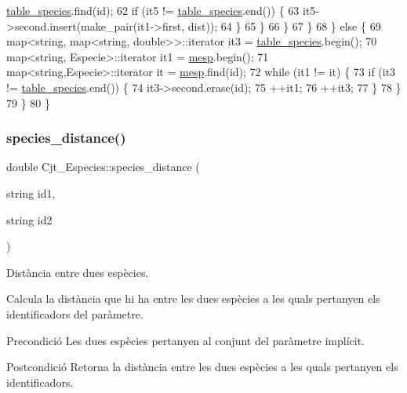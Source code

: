 \begin{DoxyCode}
      \hyperlink{class_cjt___especies_ae56d242080836b8d3db505f0a8623090}{table\_species}.find(\textcolor{keywordtype}{id});
62                     \textcolor{keywordflow}{if} (it5 != \hyperlink{class_cjt___especies_ae56d242080836b8d3db505f0a8623090}{table\_species}.end()) \{                            
63                         it5->second.insert(make\_pair(it1->first, dist));
64                     \}
65                 \}
66             \}
67         \} 
68     \} \textcolor{keywordflow}{else} \{
69         map<string, map<string, double>>::iterator it3 = \hyperlink{class_cjt___especies_ae56d242080836b8d3db505f0a8623090}{table\_species}.begin();
70         map<string, Especie>::iterator it1 = \hyperlink{class_cjt___especies_a64a525b38c78935e7432b362ea9a2306}{mesp}.begin();
71         map<string,Especie>::iterator it = \hyperlink{class_cjt___especies_a64a525b38c78935e7432b362ea9a2306}{mesp}.find(\textcolor{keywordtype}{id});
72         \textcolor{keywordflow}{while} (it1 != it) \{
73             \textcolor{keywordflow}{if} (it3 != \hyperlink{class_cjt___especies_ae56d242080836b8d3db505f0a8623090}{table\_species}.end()) \{
74                 it3->second.erase(\textcolor{keywordtype}{id});
75                 ++it1;
76                 ++it3;
77             \}        
78         \}
79     \}
80 \}
\end{DoxyCode}
\mbox{\label{class_cjt___especies_abf55093b325fd101ef73aa18dd1cf823}} 
\subsubsection{\texorpdfstring{species\+\_\+distance()}{species\_distance()}}
{\footnotesize\ttfamily double Cjt\+\_\+\+Especies\+::species\+\_\+distance (\begin{DoxyParamCaption}\item[{string}]{id1,  }\item[{string}]{id2 }\end{DoxyParamCaption})}



Distància entre dues espècies. 

Calcula la distància que hi ha entre les dues espècies a les quals pertanyen els identificadors del paràmetre.

\begin{DoxyPrecond}{Precondició}
Les dues espècies pertanyen al conjunt del paràmetre implícit. 
\end{DoxyPrecond}
\begin{DoxyPostcond}{Postcondició}
Retorna la distància entre les dues espècies a les quals pertanyen els identificadors. 
\end{DoxyPostcond}


